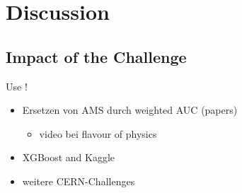 \section{Discussion}\label{ch:disc}\raggedbottom
\pagebreak


\subsection{Impact of the Challenge}
Use \cite{HEPml}!

\begin{itemize}
	\item Ersetzen von AMS durch weighted AUC (papers) \cite{diaz14}
	\begin{itemize}
		\item video bei flavour of physics
	\end{itemize}
	\item XGBoost and Kaggle 
	\item weitere CERN-Challenges
\end{itemize}

\cite{diaz14}


	{\pagebreak \thispagestyle{empty} \cleardoublepage}{\clearpage}